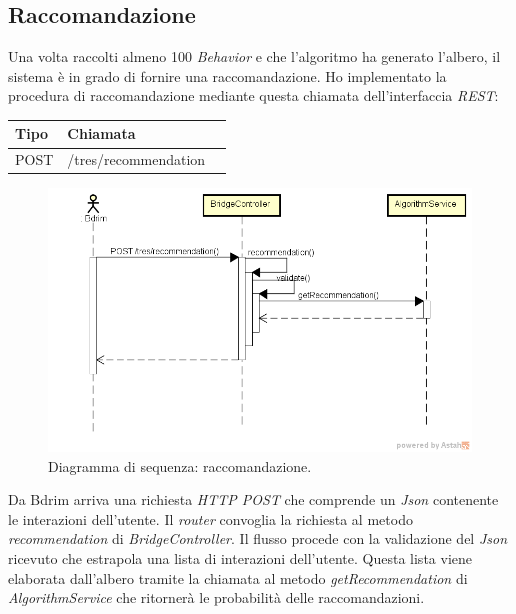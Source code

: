 \subsection{Raccomandazione}
Una volta raccolti almeno 100 \emph{Behavior} e che l'algoritmo ha generato l'albero, il sistema è in grado di fornire una raccomandazione. Ho implementato la procedura di raccomandazione mediante questa chiamata dell'interfaccia \emph{REST}:
\def\arraystretch{1.5}
\begin{longtable}{|p{2.5cm}|p{5cm}|l|}
\hline
\textbf{Tipo} &	\textbf{Chiamata}	\\\hline
POST	&	/tres/recommendation	 \\\hline
\end{longtable}
\begin{figure}[h]
\centering
\includegraphics[scale=0.42]{immagini/DSracommandazione}
\caption{Diagramma di sequenza: raccomandazione.}
\label{fig:seq-inserimentobeh}
\end{figure}
Da Bdrim arriva una richiesta \emph{HTTP POST} che comprende un \emph{Json} contenente le interazioni dell'utente. Il \emph{router} convoglia la richiesta al metodo \emph{recommendation} di \emph{BridgeController}. Il flusso procede con la validazione del \emph{Json} ricevuto che estrapola una lista di interazioni dell'utente. Questa lista viene elaborata dall'albero tramite la chiamata al metodo \emph{getRecommendation} di \emph{AlgorithmService} che ritornerà le probabilità delle raccomandazioni. 




\newpage
